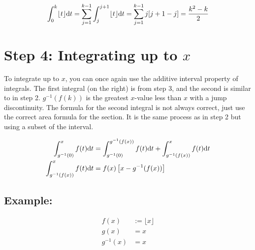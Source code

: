 \documentclass[12pt]{article}
\begin{document}
		\begin{align*}
			\int_0^k\lfloor t\rfloor\text dt
			= \sum_{j=1}^{k-1}\int_j^{j+1}\lfloor t\rfloor\text dt
			= \sum_{j=1}^{k-1}j[j+1-j]
			= \frac{k^2-k}2
		\end{align*}

\section*{Step 4: Integrating up to $x$}

	To integrate up to $x$, you can once again use the additive interval property of integrals. The first integral (on the right) is from step 3, and the second is similar to in step 2.
	$g^{-1}(f(k))$ is the greatest $x$-value less than $x$ with a jump discontinuity. The formula
	for the second integral is not always correct, just use the correct area formula for the
	section. It is the same process as in step 2 but using a subset of the interval.

	\begin{align*}
		\int_{g^{-1}(0)}^xf(t)\text dt & =\int_{g^{-1}(0)}^{g^{-1}(f(x))}f(t)\text dt+\int_{g^{-1}(f(x))}^xf(t)\text dt\\
		\int_{g^{-1}(f(x))}^xf(t)\text dt & = f(x)\left[x-g^{-1}(f(x))\right]
	\end{align*}

	\subsection*{Example:}

		\begin{minipage}{0.5\textwidth}
			\begin{align*}
				f(x) & := \lfloor x\rfloor\\
				g(x) & = x\\
				g^{-1}(x) & = x
			\end{align*}
		\end{minipage}
		\hfill
		\begin{minipage}{0.5\textwidth}
		\end{minipage}
\end{document}
